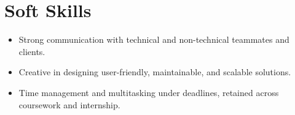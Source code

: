 \section*{Soft Skills}
\begin{itemize}
    \item Strong communication with technical and non-technical teammates and clients.
    \item Creative in designing user-friendly, maintainable, and scalable solutions.
    \item Time management and multitasking under deadlines, retained across coursework and internship.
\end{itemize}
